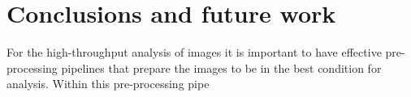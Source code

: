 \chapter{Conclusions and future work}\label{ch:conclude}

For the high-throughput analysis of images it is important to have effective pre-processing pipelines that prepare the images to be in the best condition for analysis.
Within this pre-processing pipe